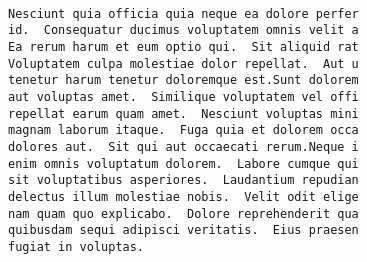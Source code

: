 \documentclass{article}
\def\separator{\vskip\baselineskip\hrule\vskip\baselineskip}
\begin{document}










\begin{verbatim}

Nesciunt quia officia quia neque ea dolore perfer
id.  Consequatur ducimus voluptatem omnis velit a
Ea rerum harum et eum optio qui.  Sit aliquid rat
Voluptatem culpa molestiae dolor repellat.  Aut u
tenetur harum tenetur doloremque est.Sunt dolorem
aut voluptas amet.  Similique voluptatem vel offi
repellat earum quam amet.  Nesciunt voluptas mini
magnam laborum itaque.  Fuga quia et dolorem occa
dolores aut.  Sit qui aut occaecati rerum.Neque i
enim omnis voluptatum dolorem.  Labore cumque qui
sit voluptatibus asperiores.  Laudantium repudian
delectus illum molestiae nobis.  Velit odit elige
nam quam quo explicabo.  Dolore reprehenderit qua
quibusdam sequi adipisci veritatis.  Eius praesen
fugiat in voluptas.

\end{verbatim}
\end{document}
